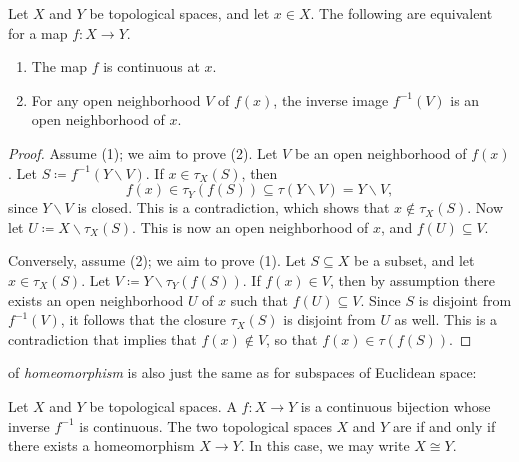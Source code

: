\begin{prp}%
\label{prp:equivalent_characterization_of_continuity_at_a_point}
	Let $X$ and $Y$ be topological spaces, and let $x \in X$.
	The following are equivalent for a map $f \colon X \to Y $.
	\begin{enumerate}
		\item The map $f $ is continuous at $x$.
		\item For any open neighborhood $V$ of $f(x)$, the inverse image $f^{-1}(V) $ is an open neighborhood of $x$.
	\end{enumerate}
\end{prp}

\begin{proof}
	Assume (1); we aim to prove (2).
	Let $V $ be an open neighborhood of $f(x)$.
	Let $S \coloneq f^{-1}(Y \smallsetminus V)$.
	If $x \in \tau_X(S)$, then
	\[
		f(x) \in \tau_Y(f(S)) \subseteq \tau(Y \smallsetminus V) = Y \smallsetminus V \comma
	\]
	since $Y \smallsetminus V $ is closed.
	This is a contradiction, which shows that $ x \notin \tau_X(S)$.
	Now let $U \coloneq X \smallsetminus \tau_X(S)$.
	This is now an open neighborhood of $x$, and $f(U) \subseteq V$.

	Conversely, assume (2); we aim to prove (1).
	Let $S \subseteq X$ be a subset, and let $x \in \tau_X(S)$.
	Let $ V \coloneq Y \smallsetminus \tau_Y(f(S))$.
	If $f(x) \in V$, then by assumption there exists an open neighborhood $U$ of $x$ such that $f(U) \subseteq V$.
	Since $S$ is disjoint from $f^{-1}(V)$, it follows that the closure $\tau_X(S)$ is disjoint from $U$ as well.
	This is a contradiction that implies that $f(x) \notin V$, so that $f(x) \in \tau(f(S))$.
\end{proof}

 of \emph{homeomorphism} is also just the same as for subspaces of Euclidean space:

\begin{dfn}
	Let $X$ and $Y$ be topological spaces.
	A  $f \colon X \to Y $ is a continuous bijection whose inverse $f^{-1}$ is continuous.
	The two topological spaces $X$ and $Y$ are  if and only if there exists a homeomorphism $X \to Y$.
	In this case, we may write $X \cong Y$.
\end{dfn}

